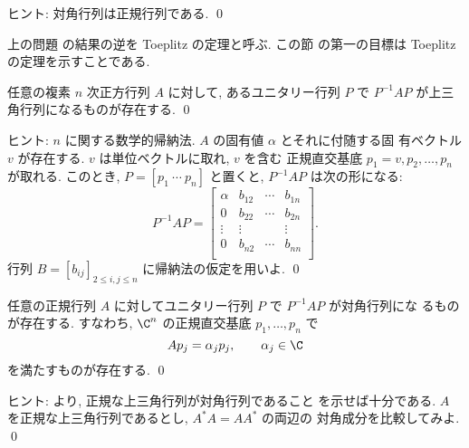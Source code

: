 \documentclass[12pt,twoside]{jarticle}
\begin{document}
\noindent
ヒント: 対角行列は正規行列である.
\qed

\medskip

上の問題  の結果の逆を Toeplitz の定理と呼ぶ.  この節
の第一の目標は Toeplitz の定理を示すことである.


\begin{question}[任意の行列の三角化可能性, 10点]
\label{q:triangularizable}
  任意の複素 $n$ 次正方行列 $A$ に対して,
  あるユニタリー行列 $P$ で $P^{-1}AP$ が上三角行列になるものが存在する.
  \qed
\end{question}

\noindent
ヒント: $n$ に関する数学的帰納法.  $A$ の固有値 $\alpha$ とそれに付随する固
有ベクトル $v$ が存在する. $v$ は単位ベクトルに取れ, $v$ を含む
正規直交基底 $p_1=v,p_2,\dots,p_n$ が取れる.  
このとき, $P=[p_1\ \cdots\ p_n]$ と置くと, $P^{-1}AP$ は次の形になる:
\begin{equation*}
  P^{-1}AP = 
  \begin{bmatrix}
    \alpha & b_{12} & \cdots & b_{1n} \\
       0   & b_{22} & \cdots & b_{2n} \\
    \vdots & \vdots &        & \vdots \\
       0   & b_{n2} & \cdots & b_{nn} \\
  \end{bmatrix}.
\end{equation*}
行列 $B=[b_{ij}]_{2\le i,j\le n}$ に帰納法の仮定を用いよ.
\qed


\begin{question}
\label{q:Toeplitz}
  任意の正規行列 $A$ に対してユニタリー行列 $P$ で $P^{-1}AP$ が対角行列にな 
  るものが存在する. すなわち, $\C^n$ の正規直交基底 $p_1,\dots,p_n$ で
  \begin{equation*}
    A p_j = \alpha_j p_j, \qquad \alpha_j \in \C
  \end{equation*}
  を満たすものが存在する. \qed
\end{question}

\noindent
ヒント:  より, 正規な上三角行列が対角行列であること
を示せば十分である.  $A$ を正規な上三角行列であるとし, $A^*A=AA^*$ の両辺の
対角成分を比較してみよ.
\qed

\end{document}
